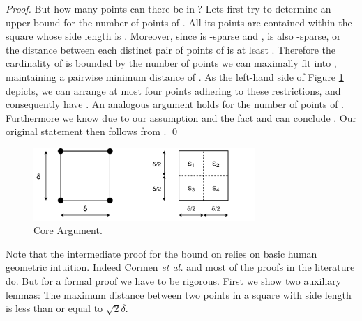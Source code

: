 \begin{isabellebody}
\begin{isamarkuptext}
\begin{proof}
But how many points can there be in ? Lets first try to determine an upper bound for the number of points of .
All its points are contained within the square  whose side length is \isa{{\isasymdelta}}. Moreover, since  is \isa{{\isasymdelta}}-sparse and
\mbox{},  is also \isa{{\isasymdelta}}-sparse, or the distance between each distinct pair of points of  is at least \isa{{\isasymdelta}}.
Therefore the cardinality of  is bounded by the number of points we can maximally fit into , maintaining
a pairwise minimum distance of \isa{{\isasymdelta}}. As the left-hand side of Figure \ref{fig:core_arguments} depicts, we can arrange at most four points
adhering to these restrictions, and consequently have . An analogous argument holds for
the number of points of . Furthermore we know  due to our assumption
 and the fact  and can conclude .
Our original statement then follows from .
\qed
\end{proof}
%
\begin{figure}[htpb]
\centering
\includegraphics[width=0.75\textwidth]{./Core_Arguments.png}
\caption[]{Core Argument.}
\label{fig:core_arguments}
\end{figure}
%
Note that the intermediate proof for the bound on  relies on basic human geometric intuition.
Indeed Cormen \emph{et al.} \cite{Introduction-to-Algorithms:2009} and most of the proofs in the literature do.
But for a formal proof we have to be rigorous. First we show two auxiliary lemmas: The maximum distance
between two points in a square  with side length \isa{{\isasymdelta}} is less than or equal to $\sqrt{2}\delta$.


\end{isamarkuptext}
\end{isabellebody}
